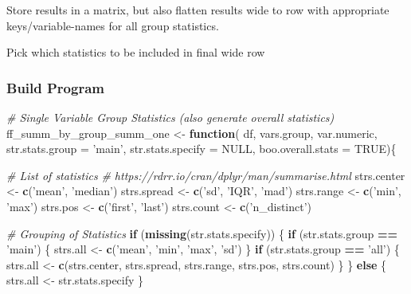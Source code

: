 \documentclass[
]{book}
\newenvironment{Shaded}{\begin{snugshade}}{\end{snugshade}}
\newcommand{\CommentTok}[1]{\textcolor[rgb]{0.56,0.35,0.01}{\textit{#1}}}
\newcommand{\ControlFlowTok}[1]{\textcolor[rgb]{0.13,0.29,0.53}{\textbf{#1}}}
\newcommand{\DataTypeTok}[1]{\textcolor[rgb]{0.13,0.29,0.53}{#1}}
\newcommand{\KeywordTok}[1]{\textcolor[rgb]{0.13,0.29,0.53}{\textbf{#1}}}
\newcommand{\NormalTok}[1]{#1}
\newcommand{\OperatorTok}[1]{\textcolor[rgb]{0.81,0.36,0.00}{\textbf{#1}}}
\newcommand{\OtherTok}[1]{\textcolor[rgb]{0.56,0.35,0.01}{#1}}
\newcommand{\StringTok}[1]{\textcolor[rgb]{0.31,0.60,0.02}{#1}}
\begin{document}
Store results in a matrix, but also flatten results wide to row with appropriate keys/variable-names for all group statistics.

Pick which statistics to be included in final wide row

\hypertarget{build-program}{%
\subsubsection{Build Program}\label{build-program}}

\begin{Shaded}
\begin{Highlighting}[]
\CommentTok{# Single Variable Group Statistics (also generate overall statistics)}
\NormalTok{ff_summ_by_group_summ_one <-}\StringTok{ }\ControlFlowTok{function}\NormalTok{(}
\NormalTok{  df, vars.group, var.numeric, }\DataTypeTok{str.stats.group =} \StringTok{'main'}\NormalTok{,}
  \DataTypeTok{str.stats.specify =} \OtherTok{NULL}\NormalTok{, }\DataTypeTok{boo.overall.stats =} \OtherTok{TRUE}\NormalTok{)\{}

    \CommentTok{# List of statistics}
    \CommentTok{# https://rdrr.io/cran/dplyr/man/summarise.html}
\NormalTok{    strs.center <-}\StringTok{ }\KeywordTok{c}\NormalTok{(}\StringTok{'mean'}\NormalTok{, }\StringTok{'median'}\NormalTok{)}
\NormalTok{    strs.spread <-}\StringTok{ }\KeywordTok{c}\NormalTok{(}\StringTok{'sd'}\NormalTok{, }\StringTok{'IQR'}\NormalTok{, }\StringTok{'mad'}\NormalTok{)}
\NormalTok{    strs.range <-}\StringTok{ }\KeywordTok{c}\NormalTok{(}\StringTok{'min'}\NormalTok{, }\StringTok{'max'}\NormalTok{)}
\NormalTok{    strs.pos <-}\StringTok{ }\KeywordTok{c}\NormalTok{(}\StringTok{'first'}\NormalTok{, }\StringTok{'last'}\NormalTok{)}
\NormalTok{    strs.count <-}\StringTok{ }\KeywordTok{c}\NormalTok{(}\StringTok{'n_distinct'}\NormalTok{)}

    \CommentTok{# Grouping of Statistics}
    \ControlFlowTok{if}\NormalTok{ (}\KeywordTok{missing}\NormalTok{(str.stats.specify)) \{}
        \ControlFlowTok{if}\NormalTok{ (str.stats.group }\OperatorTok{==}\StringTok{ 'main'}\NormalTok{) \{}
\NormalTok{            strs.all <-}\StringTok{ }\KeywordTok{c}\NormalTok{(}\StringTok{'mean'}\NormalTok{, }\StringTok{'min'}\NormalTok{, }\StringTok{'max'}\NormalTok{, }\StringTok{'sd'}\NormalTok{)}
\NormalTok{        \}}
        \ControlFlowTok{if}\NormalTok{ (str.stats.group }\OperatorTok{==}\StringTok{ 'all'}\NormalTok{) \{}
\NormalTok{            strs.all <-}\StringTok{ }\KeywordTok{c}\NormalTok{(strs.center, strs.spread, strs.range, strs.pos, strs.count)}
\NormalTok{        \}}
\NormalTok{    \} }\ControlFlowTok{else}\NormalTok{ \{}
\NormalTok{        strs.all <-}\StringTok{ }\NormalTok{str.stats.specify}
\NormalTok{    \}}


\end{Highlighting}
\end{Shaded}
\end{document}
